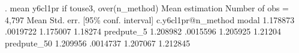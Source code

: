 . mean y6cl1pr if touse3, over(n_method)
{\smallskip}
Mean estimation                                Number of obs = 4,797
{\smallskip}
                   {\VBAR}       Mean   Std. err.     [95\% conf. interval]
c.y6cl1pr@n_method {\VBAR}
            modal  {\VBAR}   1.178873   .0019722      1.175007     1.18274
       predpute_5  {\VBAR}   1.208982   .0015596      1.205925     1.21204
      predpute_50  {\VBAR}   1.209956   .0014737      1.207067    1.212845
